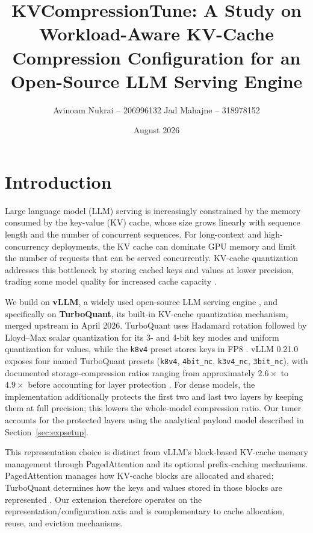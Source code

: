 \documentclass[10pt]{article}
\title{\textbf{KVCompressionTune: A Study on Workload-Aware KV-Cache\\Compression Configuration for an Open-Source LLM Serving Engine}}
\author{Avinoam Nukrai -- 206996132 \quad Jad Mahajne -- 318978152}
\date{August 2026}
\begin{document}
\maketitle

\section{Introduction}
Large language model (LLM) serving is increasingly constrained by the memory consumed by the key-value (KV) cache, whose size grows linearly with sequence length and the number of concurrent sequences. For long-context and high-concurrency deployments, the KV cache can dominate GPU memory and limit the number of requests that can be served concurrently. KV-cache quantization addresses this bottleneck by storing cached keys and values at lower precision, trading some model quality for increased cache capacity \cite{vllm,turboquant}.

We build on \textbf{vLLM}, a widely used open-source LLM serving engine \cite{vllm}, and specifically on \textbf{TurboQuant}, its built-in KV-cache quantization mechanism, merged upstream in April 2026. TurboQuant uses Hadamard rotation followed by Lloyd--Max scalar quantization for its 3- and 4-bit key modes and uniform quantization for values, while the \texttt{k8v4} preset stores keys in FP8 \cite{turboquant,vllm-tq-docs}. vLLM 0.21.0 exposes four named TurboQuant presets (\texttt{k8v4}, \texttt{4bit\_nc}, \texttt{k3v4\_nc}, \texttt{3bit\_nc}), with documented storage-compression ratios ranging from approximately $2.6\times$ to $4.9\times$ before accounting for layer protection \cite{vllm-tq-docs}. For dense models, the implementation additionally protects the first two and last two layers by keeping them at full precision; this lowers the whole-model compression ratio. Our tuner accounts for the protected layers using the analytical payload model described in Section~\ref{sec:expsetup}.

This representation choice is distinct from vLLM's block-based KV-cache memory management through PagedAttention and its optional prefix-caching mechanisms. PagedAttention manages how KV-cache blocks are allocated and shared; TurboQuant determines how the keys and values stored in those blocks are represented \cite{vllm}. Our extension therefore operates on the representation/configuration axis and is complementary to cache allocation, reuse, and eviction mechanisms.
\end{document}
